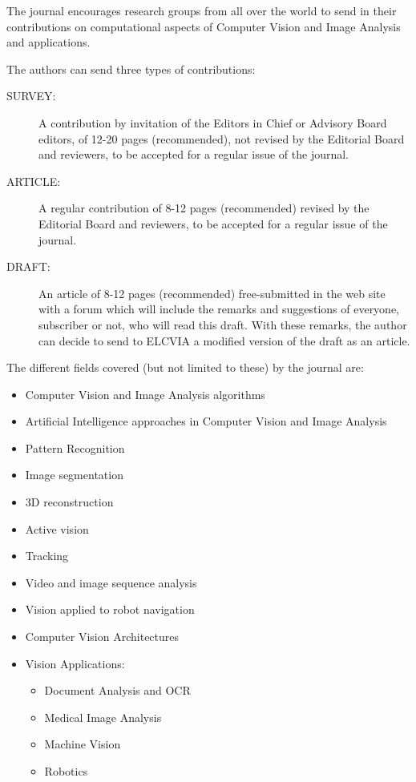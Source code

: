 \documentclass[twoside,a4paper,11pt]{article}
\begin{document}
The journal encourages research groups from all over the world
to send in their  contributions on computational aspects of Computer
Vision and Image Analysis and applications.

The authors can send three types of contributions:

\begin{description}
\item[SURVEY:] A contribution by invitation of the Editors
in Chief or Advisory Board editors, of 12-20 pages (recommended),
not revised by the Editorial Board and reviewers, to be accepted
for a regular issue of the journal.

\item[ARTICLE:] A regular contribution of 8-12 pages (recommended)
revised by the Editorial Board and reviewers, to be accepted for
a regular issue of the journal.

\item[DRAFT:] An article of 8-12 pages (recommended) free-submitted
in the web site with a forum which will include the remarks and
suggestions of everyone, subscriber or not, who will read this
draft. With these remarks, the author can decide to send to ELCVIA
a modified version of the draft as an article.

\end{description}

The different fields covered (but not limited to these) by
the journal are:

\begin{itemize}
\item Computer Vision and Image Analysis algorithms
\item Artificial Intelligence approaches in Computer Vision and
      Image Analysis
\item Pattern Recognition
\item Image segmentation
\item 3D reconstruction
\item Active vision
\item Tracking
\item Video and image sequence analysis
\item Vision applied to robot navigation
\item Computer Vision Architectures

\item Vision Applications:

\begin{itemize}
\item Document Analysis and OCR
\item Medical Image Analysis
\item Machine Vision
\item Robotics
\end{itemize}
\end{itemize}
\end{document}
